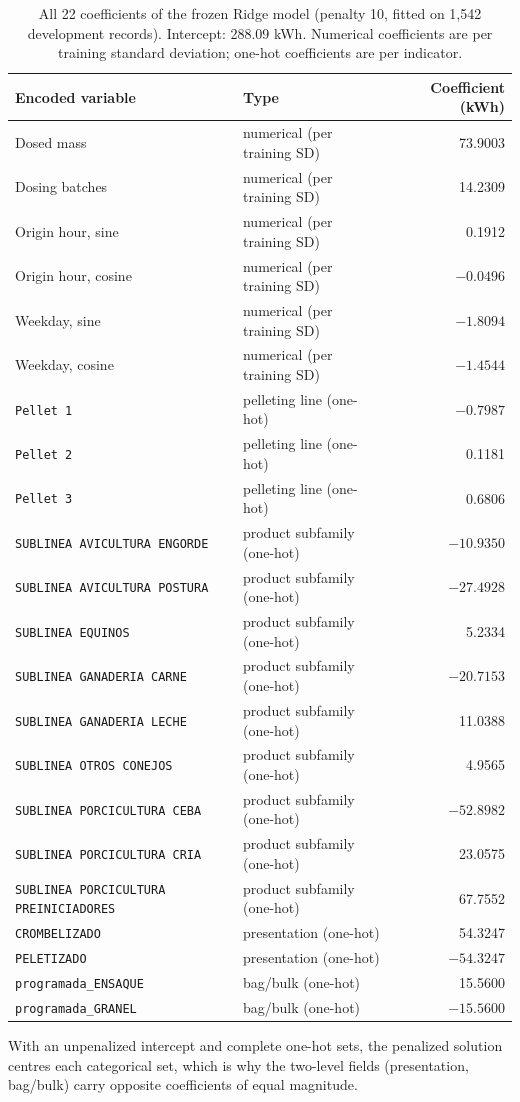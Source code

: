 \begin{table}[!htbp]\centering\footnotesize
\caption{All 22 coefficients of the frozen Ridge model (penalty 10, fitted on 1,542 development records). Intercept: 288.09 kWh. Numerical coefficients are per training standard deviation; one-hot coefficients are per indicator.}\label{tab:s_coefficients}
\begin{tabular}{@{}llr@{}}\toprule
Encoded variable & Type & Coefficient (kWh) \\\midrule
Dosed mass & numerical (per training SD) & 73.9003 \\
Dosing batches & numerical (per training SD) & 14.2309 \\
Origin hour, sine & numerical (per training SD) & 0.1912 \\
Origin hour, cosine & numerical (per training SD) & $-0.0496$ \\
Weekday, sine & numerical (per training SD) & $-1.8094$ \\
Weekday, cosine & numerical (per training SD) & $-1.4544$ \\
\texttt{Pellet 1} & pelleting line (one-hot) & $-0.7987$ \\
\texttt{Pellet 2} & pelleting line (one-hot) & 0.1181 \\
\texttt{Pellet 3} & pelleting line (one-hot) & 0.6806 \\
\texttt{SUBLINEA AVICULTURA ENGORDE} & product subfamily (one-hot) & $-10.9350$ \\
\texttt{SUBLINEA AVICULTURA POSTURA} & product subfamily (one-hot) & $-27.4928$ \\
\texttt{SUBLINEA EQUINOS} & product subfamily (one-hot) & 5.2334 \\
\texttt{SUBLINEA GANADERIA CARNE} & product subfamily (one-hot) & $-20.7153$ \\
\texttt{SUBLINEA GANADERIA LECHE} & product subfamily (one-hot) & 11.0388 \\
\texttt{SUBLINEA OTROS CONEJOS} & product subfamily (one-hot) & 4.9565 \\
\texttt{SUBLINEA PORCICULTURA CEBA} & product subfamily (one-hot) & $-52.8982$ \\
\texttt{SUBLINEA PORCICULTURA CRIA} & product subfamily (one-hot) & 23.0575 \\
\texttt{SUBLINEA PORCICULTURA PREINICIADORES} & product subfamily (one-hot) & 67.7552 \\
\texttt{CROMBELIZADO} & presentation (one-hot) & 54.3247 \\
\texttt{PELETIZADO} & presentation (one-hot) & $-54.3247$ \\
\texttt{programada\_ENSAQUE} & bag/bulk (one-hot) & 15.5600 \\
\texttt{programada\_GRANEL} & bag/bulk (one-hot) & $-15.5600$ \\
\bottomrule
\end{tabular}
\par\vspace{3pt}\footnotesize With an unpenalized intercept and complete one-hot sets, the penalized solution centres each categorical set, which is why the two-level fields (presentation, bag/bulk) carry opposite coefficients of equal magnitude.
\end{table}
